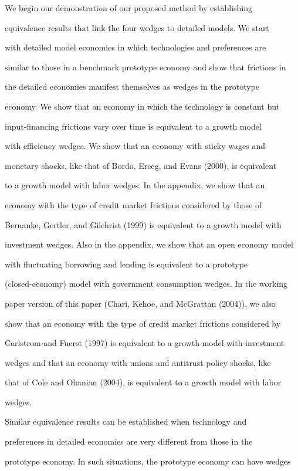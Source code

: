 \documentclass[fleqn,leqno,11pt]{article}
\begin{document}
We begin our demonstration of our proposed method by establishing

equivalence results that link the four wedges to detailed models. We start

with detailed model economies in which technologies and preferences are

similar to those in a benchmark prototype economy and show that frictions in

the detailed economies manifest themselves as wedges in the prototype

economy. We show that an economy in which the technology is constant but

input-financing frictions vary over time is equivalent to a growth model

with efficiency wedges. We show that an economy with sticky wages and

monetary shocks, like that of Bordo, Erceg, and Evans (2000), is equivalent

to a growth model with labor wedges. In the appendix, we show that an

economy with the type of credit market frictions considered by those of

Bernanke, Gertler, and Gilchrist (1999) is equivalent to a growth model with

investment wedges. Also in the appendix, we show that an open economy model

with fluctuating borrowing and lending is equivalent to a prototype

(closed-economy) model with government consumption wedges. In the working

paper version of this paper (Chari, Kehoe, and McGrattan (2004)), we also

show that an economy with the type of credit market frictions considered by

Carlstrom and Fuerst (1997) is equivalent to a growth model with investment

wedges and that an economy with unions and antitrust policy shocks, like

that of Cole and Ohanian (2004), is equivalent to a growth model with labor

wedges.



Similar equivalence results can be established when technology and

preferences in detailed economies are very different from those in the

prototype economy. In such situations, the prototype economy can have wedges
\end{document}
